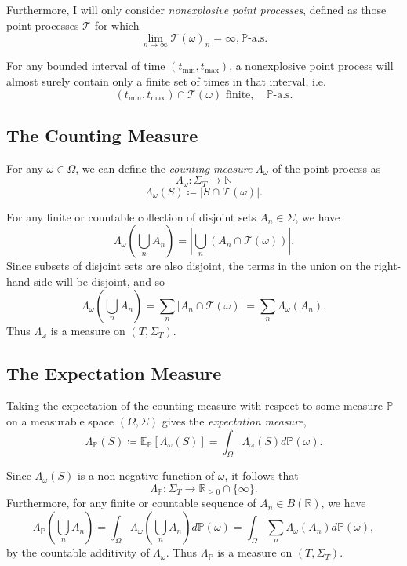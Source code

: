 \documentclass[honours,12pt]{unswthesis}
\numberwithin{equation}{section}
\begin{document}
Furthermore, I will only consider \textit{nonexplosive point processes}, defined as those point processes $\mathcal{T}$ for which
$$\lim_{n\to\infty}\mathcal{T}(\omega)_n=\infty, \mathbb{P}\text{-a.s.}$$

For any bounded interval of time $(t_{\min},t_{\max})$, a nonexplosive point process will almost surely contain only a finite set of times in that interval, i.e.
$$(t_{\min},t_{\max}) \cap \mathcal{T}(\omega) \text{ finite},\quad\mathbb{P}\text{-a.s.}$$

\subsection{The Counting Measure}
For any $\omega\in\Omega$, we can define the \textit{counting measure} $\Lambda_\omega$ of the point process as
$$\Lambda_\omega : \Sigma_T \to \mathbb{N}$$
$$\Lambda_\omega(S) \coloneq \left\vert S\cap \mathcal{T}(\omega)\right\vert.$$

For any finite or countable collection of disjoint sets $A_n\in\Sigma$, we have
$$\Lambda_\omega\left(\bigcup_n A_n\right) = \left\vert \bigcup_n \left(A_n\cap\mathcal{T}(\omega)\right)\right\vert.$$
Since subsets of disjoint sets are also disjoint, the terms in the union on the right-hand side will be disjoint, and so
$$\Lambda_\omega\left(\bigcup_n A_n\right) = \sum_n\left\vert A_n\cap \mathcal{T}(\omega)\right\vert = \sum_n \Lambda_\omega(A_n).$$
Thus $\Lambda_\omega$ is a measure on $(T,\Sigma_T)$.

\subsection{The Expectation Measure}
Taking the expectation of the counting measure with respect to some measure $\mathbb{P}$ on a measurable space $(\Omega,\Sigma)$ gives the \textit{expectation measure},
$$\Lambda_\mathbb{P}(S)\coloneq \mathbb{E}_\mathbb{P}\left[\Lambda_\omega(S)\right] = \int_\Omega \Lambda_\omega(S)d\mathbb{P}(\omega).$$

Since $\Lambda_\omega(S)$ is a non-negative function of $\omega$, it follows that $$\Lambda_{\mathbb{P}} : \Sigma_T \to \mathbb{R}_{\geq 0}\cap\{\infty\}.$$ Furthermore, for any finite or countable sequence of $A_n\in B(\mathbb{R})$, we have $$\Lambda_\mathbb{P}\left(\bigcup_n A_n\right) = \int_\Omega \Lambda_\omega\left(\bigcup_n A_n\right)d\mathbb{P}(\omega) = \int_\Omega \sum_n \Lambda_\omega(A_n) d\mathbb{P}(\omega),$$ by the countable additivity of $\Lambda_\omega$. Thus $\Lambda_\mathbb{P}$ is a measure on $(T,\Sigma_T)$.
\end{document}
